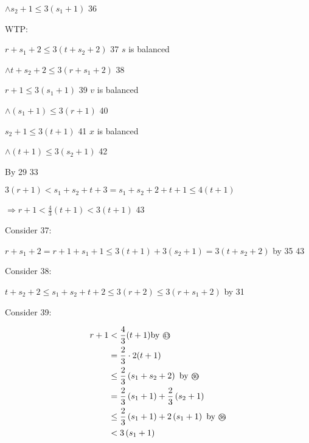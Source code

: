 \documentclass[12pt]{article}
\begin{document}
$\wedge s_{2}+1 \leq 3\left(s_{1}+1\right)$ {\small\textcircled{\scriptsize{36}}} 

WTP:

$r+s_{1}+2 \leq 3\left(t+s_{2}+2\right)$ {\small\textcircled{\scriptsize{37}}} $s$ is balanced 

$\wedge t+s_{2}+2 \leq 3\left(r+s_{1}+2\right)$ {\small\textcircled{\scriptsize{38}}} 

$r+1 \leq 3\left(s_{1}+1\right)$ {\small\textcircled{\scriptsize{39}}} $v$ is balanced 

$\wedge\left(s_{1}+1\right) \leq 3(r+1)$ {\small\textcircled{\scriptsize{40}}} 

$s_{2}+1 \leq 3(t+1)$ {\small\textcircled{\scriptsize{41}}} $x$ is balanced 

$\wedge(t+1) \leq 3\left(s_{2}+1\right)$ {\small\textcircled{\scriptsize{42}}}

By {\small\textcircled{\scriptsize{29}}} {\small\textcircled{\scriptsize{33}}}

$3(r+1)<s_{1}+s_{2}+t+3=s_{1}+s_{2}+2+t+1 \leqslant 4(t+1)$

$\Rightarrow r+1<\frac{4}{3}(t+1)<3(t+1)$ {\small\textcircled{\scriptsize{43}}}

Consider {\small\textcircled{\scriptsize{37}}}:

$r+s_{1}+2=r+1+s_{1}+1 \leqslant 3(t+1)+3\left(s_{2}+1\right)=3\left(t+s_{2}+2\right)$
by {\small\textcircled{\scriptsize{35}}} {\small\textcircled{\scriptsize{43}}}

Consider {\small\textcircled{\scriptsize{38}}}:

$t+s_{2}+2 \leq s_{1}+s_{2}+t+2 \leq 3(r+2) \leq 3\left(r+s_{1}+2\right)
$ by {\small\textcircled{\scriptsize{31}}} 

Consider {\small\textcircled{\scriptsize{39}}}:



$$
\begin{aligned}
r+1& <\frac{4}{3}(t+1) \text{by {\small\textcircled{\scriptsize{43}}}}\\
& =\frac{2}{3} \cdot 2(t+1) \\
& \leq \frac{2}{3}\left(s_{1}+s_{2}+2\right) \text { by {\small\textcircled{\scriptsize{30}}}}  \\
& =\frac{2}{3}\left(s_{1}+1\right)+\frac{2}{3}\left(s_{2}+1\right) \\
& \leq \frac{2}{3}\left(s_{1}+1\right)+2\left(s_{1}+1\right) \text { by {\small\textcircled{\scriptsize{36}}}} \\
& <3\left(s_{1}+1\right)
\end{aligned}
$$
\end{document}
